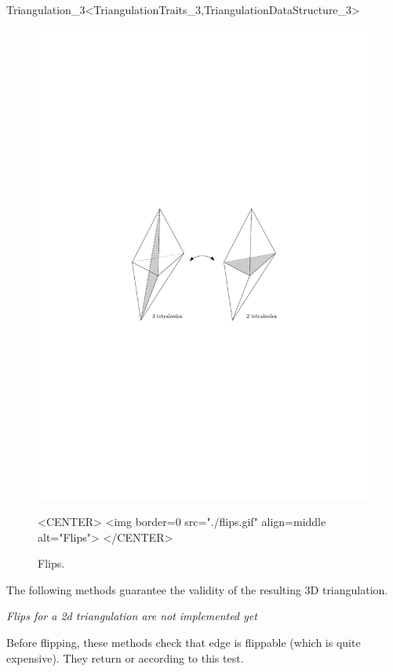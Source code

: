 \begin{ccRefClass}{Triangulation_3<TriangulationTraits_3,TriangulationDataStructure_3>}
\begin{figure}
\begin{ccTexOnly}
\begin{center} 
\includegraphics{Triangulation_3_ref/flips}
\end{center}
\end{ccTexOnly}
\caption{Flips.
\label{Triangulation3-fig-flips}}
\begin{ccHtmlOnly}
<CENTER>
<img border=0 src="./flips.gif" align=middle alt="Flips">
</CENTER>
\end{ccHtmlOnly}
\end{figure} 

The following methods guarantee the validity of the resulting 3D
triangulation.

\textit{Flips for a 2d triangulation are not implemented yet}

\ccGlue
{}
{Before flipping, these methods check that edge  is
flippable (which is quite expensive). They return  or
 according to this test.}


\end{ccRefClass}
